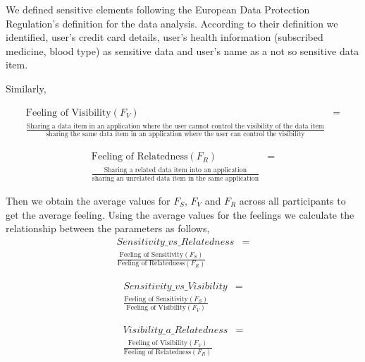 \documentclass[conference]{IEEEtran}
\begin{document}
We defined sensitive elements following the European Data Protection Regulation's definition for the data analysis. According to their definition we identified, user's credit card details, user's health information (subscribed medicine, blood type) as sensitive data and user's name as a not so sensitive data item. 

Similarly, 

 \begin{equation} \label{eq2}
\begin{split}
\text{Feeling of Visibility}(F_{V})  & = \\ \frac{\text{Sharing a data item in an application where the user cannot control the visibility of the data item}}{\text{sharing the same data item in an application where the user can control the visibility}} 
\end{split}
\end{equation}



\begin{equation} \label{eq3}
\begin{split}
\text{Feeling of Relatedness}(F_{R}) & = \\ \frac{\text{Sharing a related data item into an application}}{\text{sharing an unrelated data item in the same application}} 
\end{split}
\end{equation}


Then we obtain the average values for $F_S$, $F_V$ and $F_R$ across all participants to get the average feeling. Using the average values for the feelings we calculate the relationship between the parameters as follows,
 \begin{equation} \label{eq1}
\begin{split}
Sensitivity\_vs\_Relatedness & = \\ \frac{\text{Feeling of Sensitivity}(F_{S})}{\text{Feeling of Relatedness}(F_{R})} 
\end{split}
\end{equation}

 \begin{equation} \label{eq1}
\begin{split}
Sensitivity\_vs\_Visibility & = \\ \frac{\text{Feeling of Sensitivity}(F_{S})}{\text{Feeling of Visibility}(F_{V}) } 
\end{split}
\end{equation}

 \begin{equation} \label{eq1}
\begin{split}
Visibility\_a\_Relatedness & = \\ \frac{\text{Feeling of Visibility}(F_{V}) }{\text{Feeling of Relatedness}(F_{R})} 
\end{split}
\end{equation}
\end{document}
